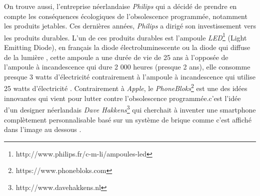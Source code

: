 \smallbreak
On trouve aussi, l'entreprise néerlandaise \textit{Philips} qui a décidé de prendre en compte les conséquences écologiques de l'obsolescence programmée, notamment les produits jetables. Ces dernières années, \textit{Philips} a dirigé son investissement vers  les produits durables. L'un de ces produits durables est l’ampoule \textit{LED}\footnote{http://www.philips.fr/c-m-li/ampoules-led} (Light Emitting Diode), en français la diode électroluminescente ou la diode qui  diffuse de la lumière , cette ampoule a une durée de vie de 25 ans à l'opposée de l'ampoule à incandescence qui dure 2 000 heures (presque 2 ans), elle consomme presque 3 watts d’électricité contrairement à l'ampoule à incandescence qui utilise 25 watts d’électricité \cite{ampoule_inc}. 
\newpage
\smallbreak
Contrairement à \textit{Apple}, le \textit{PhoneBloks}\footnote{https://www.phonebloks.com} est une des idées innovantes qui vient pour lutter contre l'obsolescence programmée.c'est l'idée d'un designer néerlandais \textit{Dave Hakkens}\footnote{http://www.davehakkens.nl} qui cherchait à inventer une smartphone complètement personnalisable basé sur un système de brique comme c'est affiché dans l'image au dessous \cite{op_pb}.
